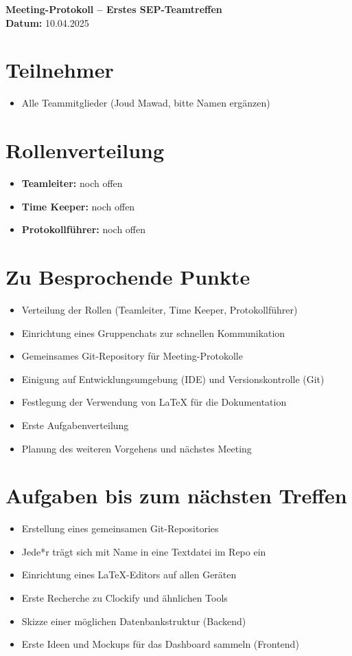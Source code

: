 \documentclass[11pt,a4paper]{article}
\newcommand{\checkbox}{\(\square\)}
\begin{document}
\begin{center}
    {\large \textbf{Meeting-Protokoll – Erstes SEP-Teamtreffen}}\\[0.3em]
    \textbf{Datum:} 10.04.2025
\end{center}

\section*{Teilnehmer}
\begin{itemize}
    \item Alle Teammitglieder (Joud Mawad, bitte Namen ergänzen)
\end{itemize}

\section*{Rollenverteilung}
\begin{itemize}
    \item \textbf{Teamleiter:} noch offen
    \item \textbf{Time Keeper:} noch offen
    \item \textbf{Protokollführer:} noch offen
\end{itemize}

\section*{Zu Besprochende Punkte}
\begin{itemize}
    \item Verteilung der Rollen (Teamleiter, Time Keeper, Protokollführer)
    \item Einrichtung eines Gruppenchats zur schnellen Kommunikation
    \item Gemeinsames Git-Repository für Meeting-Protokolle
    \item Einigung auf Entwicklungsumgebung (IDE) und Versionskontrolle (Git)
    \item Festlegung der Verwendung von \LaTeX{} für die Dokumentation
    \item Erste Aufgabenverteilung
    \item Planung des weiteren Vorgehens und nächstes Meeting
\end{itemize}

\section*{Aufgaben bis zum nächsten Treffen}
\begin{itemize}[label=\checkbox]
    \item Erstellung eines gemeinsamen Git-Repositories
    \item Jede*r trägt sich mit Name in eine Textdatei im Repo ein
    \item Einrichtung eines LaTeX-Editors auf allen Geräten
    \item Erste Recherche zu Clockify und ähnlichen Tools
    \item Skizze einer möglichen Datenbankstruktur (Backend)
    \item Erste Ideen und Mockups für das Dashboard sammeln (Frontend)
\end{itemize}
\end{document}
